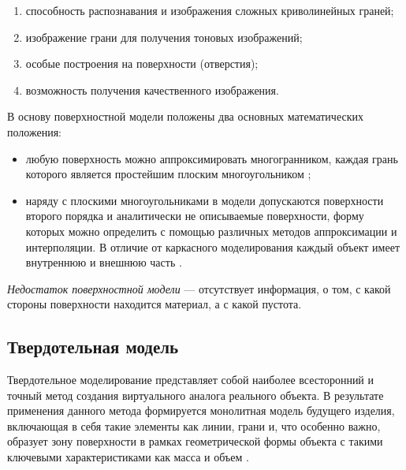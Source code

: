 \begin{enumerate}
	\item способность распознавания и изображения сложных криволинейных граней;
	\item изображение грани для получения тоновых изображений;
	\item особые построения на поверхности (отверстия);
	\item возможность получения качественного изображения.
\end{enumerate}


В основу поверхностной модели положены два основных математических положения:
\begin{itemize}
\item любую поверхность можно аппроксимировать
многогранником, каждая грань которого является простейшим плоским
многоугольником \cite{model_geom_01};
\item наряду с плоскими многоугольниками в модели допускаются поверхности второго порядка и аналитически не описываемые поверхности, форму которых можно определить с помощью различных методов аппроксимации и интерполяции. В отличие от каркасного моделирования каждый объект имеет внутреннюю и внешнюю часть \cite{model_geom_01}.
\end{itemize}


\textit{Недостаток поверхностной модели} --- отсутствует информация, о том, с какой стороны поверхности находится материал, а с какой пустота.

\subsection{Твердотельная модель}

Твердотельное моделирование представляет собой наиболее всесторонний и точный метод создания виртуального аналога реального объекта. В результате применения данного метода формируется монолитная модель будущего изделия, включающая в себя такие элементы как линии, грани и, что особенно важно, образует зону поверхности в рамках геометрической формы объекта с такими ключевыми характеристиками как масса и объем \cite{model_geom_01}.

